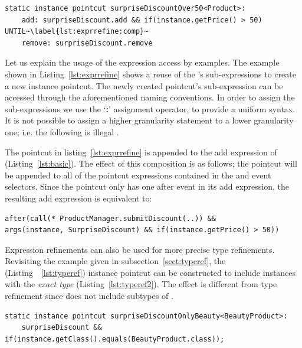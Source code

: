 \begin{lstlisting}[float=h!, caption={Expression refinement of \lstinln{surpriseDiscount}(Listing~\ref{lst:basic}) instance pointcut}, label={lst:exprrefine}]
static instance pointcut surpriseDiscountOver50<Product>: 
	add: surpriseDiscount.add && if(instance.getPrice() > 50) UNTIL~\label{lst:exprrefine:comp}~
    remove: surpriseDiscount.remove
\end{lstlisting}

Let us explain the usage of the expression access by examples. The example shown in Listing~\ref{lst:exprrefine} shows a reuse of the 's sub-expressions to create a new instance pointcut. The newly created pointcut's sub-expression can be accessed through the aforementioned naming conventions. In order to assign the sub-expressions we use the `\textbf{\textsf{:}}' assignment operator, to provide a uniform syntax.  It is not possible to assign a higher granularity statement to a lower granularity one; i.e. the following is illegal .




The  pointcut in listing~\ref{lst:exprrefine} is appended to the add expression of  (Listing~\ref{lst:basic}). The effect of this composition is  as follows; the  pointcut will be appended to all of the pointcut expressions contained in the  and  event selectors. Since the   pointcut only has one after event in its add expression, the resulting add expression is equivalent to: 

\begin{lstlisting}[float = h!, numbers=none]
after(call(* ProductManager.submitDiscount(..)) && 
args(instance, SurpriseDiscount) && if(instance.getPrice() > 50))
\end{lstlisting}

Expression refinements can also be used for more precise type refinements. Revisiting the example given in subsection~\ref{sect:typeref}, the  (Listing~~\ref{lst:typeref}) instance pointcut can be constructed to include instances with the \emph{exact type}  (Listing~\ref{lst:typeref2}). The effect is different from type refinement since  does not include subtypes of . 

\begin{lstlisting}[float=h!,caption={Type refinement by expression refinement}, label={lst:typeref2}]
static instance pointcut surpriseDiscountOnlyBeauty<BeautyProduct>: 
	surpriseDiscount && if(instance.getClass().equals(BeautyProduct.class));
\end{lstlisting}


